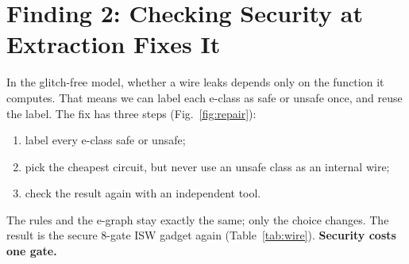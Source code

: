 \documentclass[conference]{IEEEtran}
\begin{document}
\section{Finding 2: Checking Security at Extraction Fixes It}\label{sec:rq2}
In the glitch-free model, whether a wire leaks depends only on the function it computes. That means we can label each e-class as safe or unsafe once, and reuse the label. The fix has three steps (Fig.~\ref{fig:repair}):
\begin{enumerate}
\item label every e-class safe or unsafe;
\item pick the cheapest circuit, but never use an unsafe class as an internal wire;
\item check the result again with an independent tool.
\end{enumerate}
The rules and the e-graph stay exactly the same; only the choice changes. The result is the secure 8-gate ISW gadget again (Table~\ref{tab:wire}). \textbf{Security costs one gate.}
\end{document}
